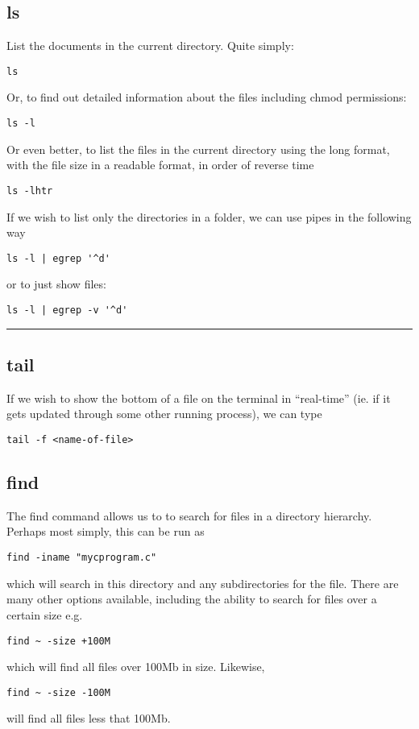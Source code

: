 \documentclass[a4paper, 10pt]{article}
\newcommand{\mybotrule}{\vspace{4mm}\hrule}
\begin{document}
\subsection*{ls}
List the documents in the current directory. Quite simply:
\begin{verbatim}
ls
\end{verbatim}
Or, to find out detailed information about the files including chmod permissions:
\begin{verbatim}
ls -l
\end{verbatim}
Or even better, to list the files in the current directory using the long format, with the file size in a readable format, in order of reverse time
\begin{verbatim}
ls -lhtr
\end{verbatim}
If we wish to list only the directories in a folder, we can use pipes in the following way
\begin{verbatim}
ls -l | egrep '^d'
\end{verbatim}
or to just show files:
\begin{verbatim}
ls -l | egrep -v '^d'
\end{verbatim}
\mybotrule

\subsection*{tail}
\label{sec:tail}

If we wish to show the bottom of a file on the terminal in
``real-time'' (ie. if it gets updated through some other running
process), we can type 
\begin{verbatim}
tail -f <name-of-file>
\end{verbatim}


\subsection*{find}
\label{sec:find}

The find command allows us to to search for files in a directory
hierarchy. Perhaps most simply, this can be run as
\begin{verbatim}
find -iname "mycprogram.c"
\end{verbatim}
which will search in this directory and any subdirectories for the
file. There are many other options available, including the ability to
search for files over a certain size e.g.
\begin{verbatim}
find ~ -size +100M 
\end{verbatim}
which will find all files over 100Mb in size. Likewise, 
\begin{verbatim}
find ~ -size -100M
\end{verbatim}
will find all files less that 100Mb.
\end{document}
